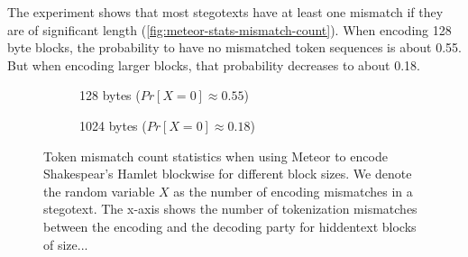 The experiment shows that most stegotexts have at least one mismatch if they are of significant length (\autoref{fig:meteor-stats-mismatch-count}).
When encoding 128 byte blocks, the probability to have no mismatched token sequences is about 0.55.
But when encoding larger blocks, that probability decreases to about 0.18.

\begin{figure}[htbp]%
	\begin{subfigure}{.5\textwidth}%
		\centering%
	    \resizebox{0.9\linewidth}{!}{%
		}%
		\caption{128 bytes ($Pr[X=0] \approx 0.55$)}%
	\end{subfigure}%
	\begin{subfigure}{.5\textwidth}%
		\centering%
	    \resizebox{0.9\linewidth}{!}{%
		}%
		\caption{1024 bytes ($Pr[X=0] \approx 0.18$)}%
	\end{subfigure}%
	\caption{
	Token mismatch count statistics when using Meteor to encode Shakespear's Hamlet blockwise for different block sizes.
	We denote the random variable $X$ as the number of encoding mismatches in a stegotext.
	The x-axis shows the number of tokenization mismatches between the encoding and the decoding party for hiddentext blocks of size...}
	\label{fig:meteor-stats-mismatch-count}	
\end{figure}



